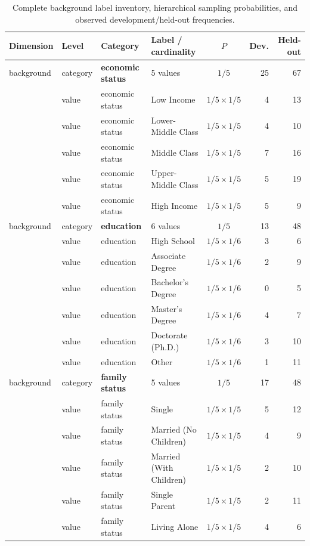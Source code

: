 \documentclass{ieeeaccess}
\begin{document}
\renewcommand{\thetable}{S2c}
\begin{table}[H]
\centering
\footnotesize
\renewcommand{\arraystretch}{0.92}
\caption{Complete background label inventory, hierarchical sampling probabilities, and observed development/held-out frequencies.}
\label{tab:persona-schema-background}
\begin{tabularx}{\textwidth}{l l l X c r r}
\toprule
Dimension & Level & Category & Label / cardinality & $P$ & Dev. & Held-out \\
\midrule
background & category & \textbf{economic status} & 5 values & $1/5$ & 25 & 67 \\
 & value & economic status & Low Income & $1/5\times1/5$ & 4 & 13 \\
 & value & economic status & Lower-Middle Class & $1/5\times1/5$ & 4 & 10 \\
 & value & economic status & Middle Class & $1/5\times1/5$ & 7 & 16 \\
 & value & economic status & Upper-Middle Class & $1/5\times1/5$ & 5 & 19 \\
 & value & economic status & High Income & $1/5\times1/5$ & 5 & 9 \\
background & category & \textbf{education} & 6 values & $1/5$ & 13 & 48 \\
 & value & education & High School & $1/5\times1/6$ & 3 & 6 \\
 & value & education & Associate Degree & $1/5\times1/6$ & 2 & 9 \\
 & value & education & Bachelor's Degree & $1/5\times1/6$ & 0 & 5 \\
 & value & education & Master's Degree & $1/5\times1/6$ & 4 & 7 \\
 & value & education & Doctorate (Ph.D.) & $1/5\times1/6$ & 3 & 10 \\
 & value & education & Other & $1/5\times1/6$ & 1 & 11 \\
background & category & \textbf{family status} & 5 values & $1/5$ & 17 & 48 \\
 & value & family status & Single & $1/5\times1/5$ & 5 & 12 \\
 & value & family status & Married (No Children) & $1/5\times1/5$ & 4 & 9 \\
 & value & family status & Married (With Children) & $1/5\times1/5$ & 2 & 10 \\
 & value & family status & Single Parent & $1/5\times1/5$ & 2 & 11 \\
 & value & family status & Living Alone & $1/5\times1/5$ & 4 & 6 \\

\end{tabularx}
\end{table}
\end{document}
